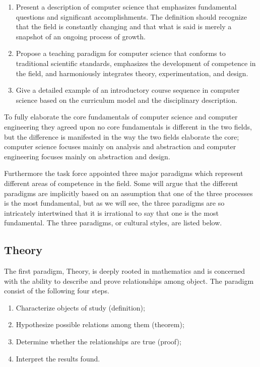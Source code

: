 \documentclass[thesis.tex]{subfiles}
\begin{document}
\begin{enumerate}
\item Present a description of computer science that emphasizes fundamental questions and significant accomplishments. The definition should recognize that the field is constantly changing and that what is said is merely a snapshot of an ongoing process of growth.
\item Propose a teaching paradigm for computer science that conforms to traditional scientific standards, emphasizes the development of competence in the field, and harmoniously integrates theory, experimentation, and design.
\item Give a detailed example of an introductory course sequence in computer science based on the curriculum model and the disciplinary description.
\end{enumerate}

To fully elaborate the core fundamentals of computer science and computer engineering they agreed upon no core fundamentals is different in the two fields, but the difference is manifested in the way the two fields elaborate the core; computer science focuses mainly on analysis and abstraction and computer engineering focuses mainly on abstraction and design.

Furthermore the task force appointed three major paradigms which represent different areas of competence in the field. Some will argue that the different paradigms are implicitly based on an assumption that one of the three processes is the most fundamental, but as we will see, the three paradigms are so intricately intertwined that it is irrational to say that one is the most fundamental. The three paradigms, or cultural styles, are listed below.

\subsection{Theory} \label{sec:theory}
The first paradigm, Theory, is deeply rooted in mathematics and is concerned with the ability to describe and prove relationships among object. The paradigm consist of the following four steps.

\begin{enumerate}
\item Characterize objects of study (definition);
\item Hypothesize possible relations among them (theorem);
\item Determine whether the relationships are true (proof);
\item Interpret the results found.
\end{enumerate}
\end{document}
